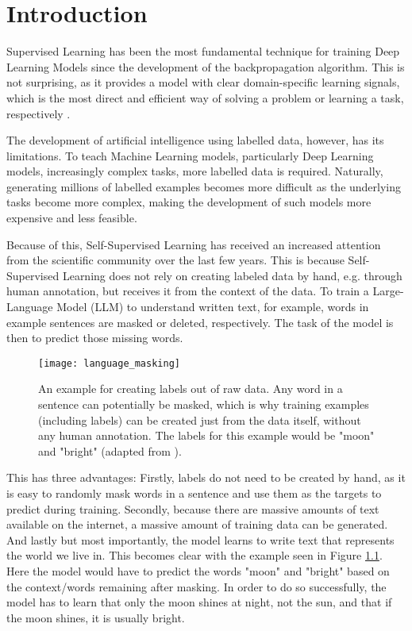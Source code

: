 \chapter{Introduction}
Supervised Learning has been the most fundamental technique for
training Deep Learning Models since the development of the backpropagation
algorithm. This is not surprising, as it provides a model with clear domain-specific learning signals, which is the most
direct and efficient way of solving a problem or learning a task, respectively \cite{geron}.

The development of artificial intelligence using labelled
data, however, has its limitations. To teach Machine Learning models, particularly Deep Learning models,
increasingly complex tasks, more labelled data is required.
Naturally, generating millions of labelled examples becomes 
more difficult as the underlying tasks become more complex, making the development of
such models more expensive and less feasible.

Because of this, Self-Supervised Learning has received an increased attention from the scientific
community over the last few years. This is because Self-Supervised Learning does not
rely on creating labeled data by hand, e.g. through human annotation, but receives it
from the context of the data. To train a Large-Language Model (LLM) to understand 
written text, for example, words in example sentences are masked or
deleted, respectively. The task of the model is then to predict those missing words.


\begin{figure}[htbp]
	\texttt{[image: language\_masking]}
	\centering
    \label{language_masking}
	\caption{An example for creating labels out of raw data. Any word in a sentence can
    potentially be masked, which is why training examples (including labels) can be created
    just from the data itself, without any human annotation. The labels for this example would
    be "moon" and "bright" (adapted from \cite{lecun}).}
\end{figure}

This has three advantages: Firstly, labels do not need to be created by hand, as it is easy
to randomly mask words in a sentence and use them as the targets to predict during training.
Secondly, because there are massive amounts of text available on the internet, a massive amount of training
data can be generated.
And lastly but most importantly, the model learns to write text that represents the world we live in.
This becomes clear with the example seen in Figure \ref{language_masking}.
Here the model would have to predict the words "moon" and "bright" based on the context/words
remaining after masking. In order to do so successfully, the model has to learn that only the moon shines at night, not the
sun, and that if the moon shines, it is usually bright.

